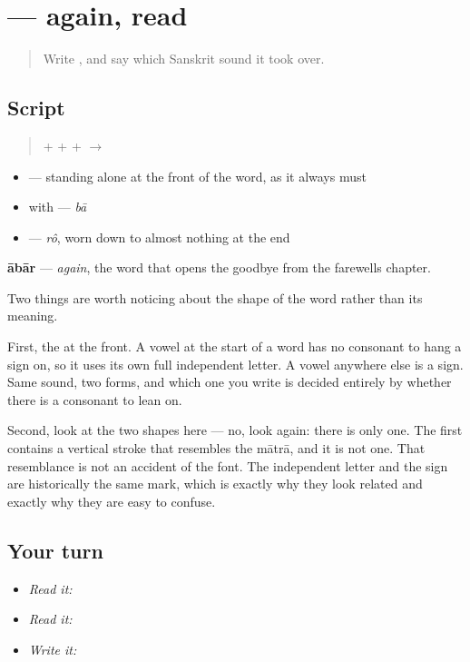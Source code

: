 \section[ābār]{ — again, read}

\label{lesson:BN-W03-abar-read}



\begin{quote}
Write \textbf{}, and say which Sanskrit sound it took over.
\end{quote}

\subsection*{Script}
\begin{quote}
\textbf{} + \textbf{} + \textbf{} + \textbf{} $\to$ \textbf{}
\end{quote}

\begin{itemize}
\raggedright
  \item \textbf{} — standing alone at the front of the word, as it always must
  \item \textbf{} with \textbf{} — \emph{bā}
  \item \textbf{} — \emph{rô}, worn down to almost nothing at the end
\end{itemize}

\textbf{ābār} — \emph{again}, the word that opens the goodbye from the farewells chapter.

Two things are worth noticing about the shape of the word rather than its meaning.

First, the \textbf{} at the front. A vowel at the start of a word has no consonant to hang a sign on, so it uses its own full independent letter. A vowel anywhere else is a sign. Same sound, two forms, and which one you write is decided entirely by whether there is a consonant to lean on.

Second, look at the two \textbf{} shapes here — no, look again: there is only one. The first \textbf{} contains a vertical stroke that resembles the mātrā, and it is not one. That resemblance is not an accident of the font. The independent letter and the sign are historically the same mark, which is exactly why they look related and exactly why they are easy to confuse.

\subsection*{Your turn}
\begin{itemize}
\raggedright
  \item \emph{Read it:} 
  \item \emph{Read it:} 
  \item \emph{Write it:} 
\end{itemize}

